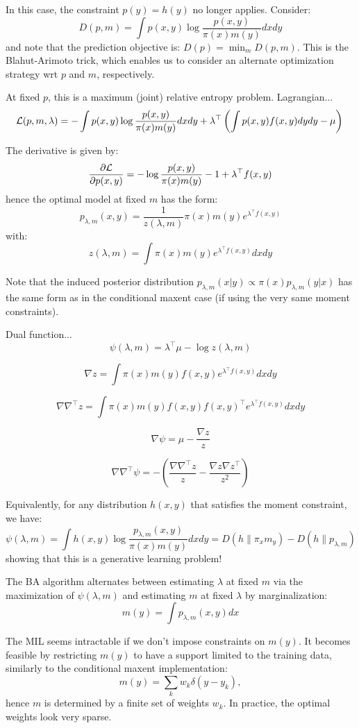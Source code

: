 \documentclass[english]{scrartcl}
\begin{document}
In this case, the constraint $p(y)=h(y)$ no longer applies. Consider:
$$
D(p,m) = \int p(x,y) \log \frac{p(x,y)}{\pi(x)m(y)} dx dy
$$
and note that the prediction objective is: $D(p) = \min_m D(p,m)$. This is the Blahut-Arimoto trick, which enables us to consider an alternate optimization strategy wrt $p$ and $m$, respectively. 

At fixed $p$, this is a maximum (joint) relative entropy problem. Lagrangian...
$$
{\cal L}(p,m,\lambda)
=
- \int p(x,y) \log \frac{p(x,y)}{\pi(x)m(y)} dxdy
+
\lambda^\top \left( 
\int p(x,y) f(x,y) dydy - \mu 
\right) \\
$$

The derivative is given by:
$$
\frac{\partial\cal L}{\partial p(x,y)}
= 
- \log \frac{p(x,y)}{\pi(x)m(y)} - 1
+ \lambda^\top f(x,y)
$$
hence the optimal model at fixed $m$ has the form:
$$
p_{\lambda,m}(x,y) = \frac{1}{z(\lambda,m)} \pi(x) m(y) e^{\lambda^\top f(x,y)} 
$$
with:
$$
z(\lambda,m) = \int \pi(x) m(y) e^{\lambda^\top f(x,y)} dx dy
$$

Note that the induced posterior distribution $p_{\lambda,m}(x|y)\propto \pi(x)p_{\lambda,m}(y|x)$ has the same form as in the conditional maxent case (if using the very same moment constraints).

Dual function...
$$
\psi(\lambda,m) 
= \lambda^\top \mu - \log z(\lambda, m)
$$

$$
\nabla z = \int \pi(x) m(y) f(x,y) e^{\lambda^\top f(x,y)} dx dy
$$

$$
\nabla\nabla^\top z = \int \pi(x)m(y) f(x,y) f(x,y)^\top e^{\lambda^\top f(x,y)} dxdy
$$

$$
\nabla \psi = \mu - \frac{\nabla z}{z} 
$$

$$
\nabla\nabla^\top \psi = 
- \left(
\frac{\nabla \nabla^\top z}{z} 
- \frac{\nabla z \nabla z^\top}{z^2}
\right) 
$$

Equivalently, for any distribution $h(x,y)$ that satisfies the moment constraint, we have:
$$
\psi(\lambda,m) 
=
\int h(x,y) \log \frac{p_{\lambda,m}(x,y)}{\pi(x)m(y)} dxdy
= D(h\|\pi_xm_y) - D(h\|p_{\lambda,m})
$$
showing that this is a generative learning problem!

The BA algorithm alternates between estimating $\lambda$ at fixed $m$ via the maximization of $\psi(\lambda,m)$ and estimating $m$ at fixed $\lambda$ by marginalization:
$$
m(y) = \int p_{\lambda,m}(x,y) dx
$$

The MIL seems intractable if we don't impose constraints on $m(y)$. It becomes feasible by restricting $m(y)$ to have a support limited to the training data, similarly to the conditional maxent implementation:
$$
m(y) = \sum_k w_k \delta(y-y_k),
$$
hence $m$ is determined by a finite set of weights $w_k$. In practice, the optimal weights look very sparse.
\end{document}

